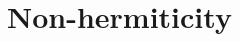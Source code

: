 \documentclass[usepdftitle=false]{beamer}
\begin{document}

\section{Non-hermiticity}
\end{document}
